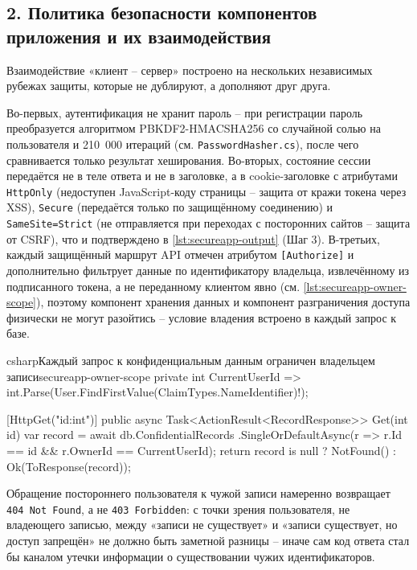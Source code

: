 \subsection*{2. Политика безопасности компонентов приложения и их взаимодействия}

Взаимодействие «клиент -- сервер» построено на нескольких независимых
рубежах защиты, которые не дублируют, а дополняют друг друга.

Во-первых, аутентификация не хранит пароль -- при регистрации пароль
преобразуется алгоритмом PBKDF2-HMACSHA256 со случайной солью на
пользователя и 210~000 итераций (см. \texttt{PasswordHasher.cs}), после
чего сравнивается только результат хеширования. Во-вторых, состояние
сессии передаётся не в теле ответа и не в заголовке, а в
cookie-заголовке с атрибутами \texttt{HttpOnly} (недоступен
JavaScript-коду страницы -- защита от кражи токена через XSS),
\texttt{Secure} (передаётся только по защищённому соединению) и
\texttt{SameSite=Strict} (не отправляется при переходах с посторонних
сайтов -- защита от CSRF), что и подтверждено в
\autoref{lst:secureapp-output} (Шаг 3). В-третьих, каждый защищённый
маршрут API отмечен атрибутом \texttt{[Authorize]} и дополнительно
фильтрует данные по идентификатору владельца, извлечённому из подписанного
токена, а не переданному клиентом явно (см.
\autoref{lst:secureapp-owner-scope}), поэтому компонент хранения данных и
компонент разграничения доступа физически не могут разойтись -- условие
владения встроено в каждый запрос к базе.

\begin{codelisting}{csharp}{Каждый запрос к конфиденциальным данным ограничен владельцем записи}{secureapp-owner-scope}
private int CurrentUserId => int.Parse(User.FindFirstValue(ClaimTypes.NameIdentifier)!);

[HttpGet("{id:int}")]
public async Task<ActionResult<RecordResponse>> Get(int id)
{
    var record = await db.ConfidentialRecords
        .SingleOrDefaultAsync(r => r.Id == id && r.OwnerId == CurrentUserId);
    return record is null ? NotFound() : Ok(ToResponse(record));
}
\end{codelisting}

Обращение постороннего пользователя к чужой записи намеренно возвращает
\texttt{404 Not Found}, а не \texttt{403 Forbidden}: с точки зрения
пользователя, не владеющего записью, между «записи не существует» и
«записи существует, но доступ запрещён» не должно быть заметной разницы --
иначе сам код ответа стал бы каналом утечки информации о существовании
чужих идентификаторов.

